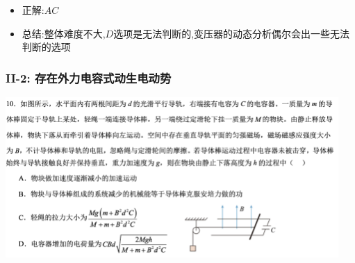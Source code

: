 \documentclass{article}
\begin{document}
\begin{itemize}
    \item 正解:\quad $AC$
    \item 总结:\quad 整体难度不大,$D$选项是无法判断的,变压器的动态分析偶尔会出一些无法判断的选项
\end{itemize}


\vspace{2em}

\subsubsection{II-2: 存在外力电容式动生电动势}
\includegraphics[width=0.95\textwidth,keepaspectratio]{./pictures/3.11-3.png}
\end{document}
